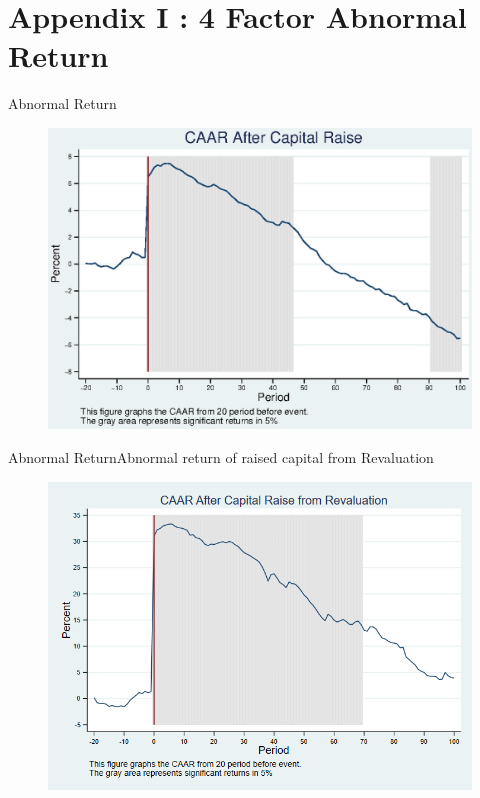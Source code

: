 \documentclass{beamer}
\begin{document}
%


\appendix






\section{Appendix I : 4 Factor Abnormal Return}
\begin{frame}{Abnormal Return}
\label{abreturn4Factor}
\begin{figure}
\centering
\includegraphics[width=0.7\linewidth]{AbReturn_4Factor.eps}
\label{fig:abreturn2}
\end{figure}
\hfill\hyperlink{abreturn}{}
\end{frame}

\begin{frame}{Abnormal Return}{Abnormal return of raised capital from Revaluation}
\label{abreturnrevalution4Factor}
\begin{figure}
\centering
\includegraphics[width=0.65\linewidth]{AbReturnRevalution_4Factor}
\label{fig:abreturnrevalution2}
\end{figure}

\hfill\hyperlink{abreturnrevalution}{}
\end{frame}
\end{document}
